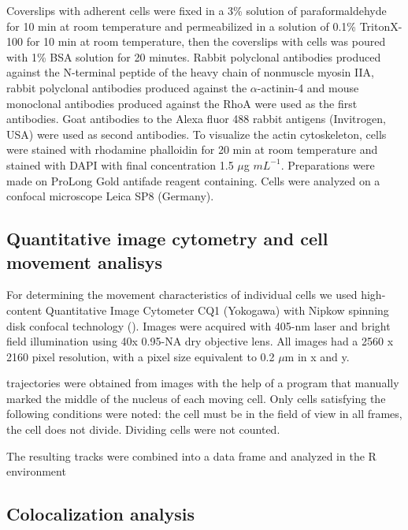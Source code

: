 \documentclass[english,authoryear]{elsarticle}
\begin{document}
Coverslips with adherent cells were fixed in a 3\% solution of paraformaldehyde for 10 min at room temperature and permeabilized in a solution of 0.1\% TritonX-100 for 10 min at room temperature, then the coverslips with cells was poured with 1\% BSA solution for 20 minutes.
Rabbit polyclonal antibodies produced against the N-terminal peptide of the heavy chain of nonmuscle myosin IIA, rabbit polyclonal antibodies produced against the $\alpha$-actinin-4 and mouse monoclonal antibodies produced against the RhoA were used as the first antibodies. Goat antibodies to the Alexa fluor 488 rabbit antigens (Invitrogen, USA) were used as second antibodies. To visualize the actin cytoskeleton, cells were stained with rhodamine phalloidin for 20 min at room temperature and stained with DAPI with final concentration 1.5 $\mu$g $mL^{−1}$. Preparations were made on ProLong Gold antifade reagent containing. Cells were analyzed on a confocal microscope Leica SP8 (Germany).

\subsection{Quantitative image cytometry and cell movement analisys}

For determining the movement characteristics of individual cells we used high-content Quantitative Image Cytometer CQ1 (Yokogawa) with Nipkow spinning disk confocal technology (\cite{sakashita2015cq1}).
Images were acquired with 405-nm laser and bright field illumination using 40x 0.95-NA dry objective lens. All images had a 2560 x 2160 pixel resolution, with a pixel size equivalent to 0.2 $\mu$m in x and y.

trajectories were obtained from images with the help of a program that manually marked the middle of the nucleus of each moving cell. Only cells satisfying the following conditions were noted: the cell must be in the field of view in all frames, the cell does not divide. Dividing cells were not counted.

The resulting tracks were combined into a data frame and analyzed in the R environment

\subsection{Colocalization analysis}
\end{document}
